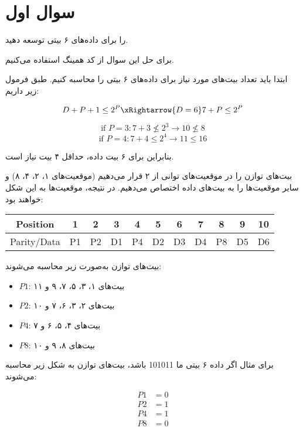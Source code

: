 \section{سوال اول}

را برای داده‌های ۶ بیتی توسعه دهید.

\begin{qsolve}
	برای حل این سوال از کد همینگ استفاده می‌کنیم.
	
	ابتدا باید تعداد بیت‌های  مورد نیاز برای داده‌های ۶ بیتی را محاسبه کنیم. طبق فرمول زیر داریم:
	
	\begin{latin}
		$$ D+P+1 \le 2^P  \xRightarrow{D=6} 7+P\le2^P $$
		
		$$ \text{if } P=3: 7 + 3 \not \leq 2^3 \rightarrow 10 \not \leq 8$$
		$$ \text{if } P=4: 7 + 4 \le  2^4 \rightarrow 11 \leq 16$$
	\end{latin}
	
	
	بنابراین برای ۶ بیت داده، حداقل ۴ بیت  نیاز است.
	
	بیت‌های توازن را در موقعیت‌های توانی از ۲ قرار می‌دهیم (موقعیت‌های ۱، ۲، ۴، ۸) و سایر موقعیت‌ها را به بیت‌های داده اختصاص می‌دهیم. در نتیجه، موقعیت‌ها به این شکل خواهند بود:
	
	\begin{latin}
		\begin{center}
			\begin{tabular}{|c|c|c|c|c|c|c|c|c|c|c|}
				\hline
				Position & 1 & 2 & 3 & 4 & 5 & 6 & 7 & 8 & 9 & 10 \\
				\hline
				Parity/Data & P1 & P2 & D1 & P4 & D2 & D3 & D4 & P8 & D5 & D6 \\
				\hline
			\end{tabular}
		\end{center}
	\end{latin}
	
	
	بیت‌های توازن به‌صورت زیر محاسبه می‌شوند:
	
	\begin{itemize}
		\item \( P1 \): بیت‌های ۱، ۳، ۵، ۷، ۹ و ۱۱
		\item \( P2 \): بیت‌های ۲، ۳، ۶، ۷ و ۱۰
		\item \( P4 \): بیت‌های ۴، ۵، ۶ و ۷
		\item \( P8 \): بیت‌های ۸، ۹ و ۱۰
	\end{itemize}
	
	
	برای مثال اگر داده ۶ بیتی ما 101011 باشد، بیت‌های توازن به شکل زیر محاسبه می‌شوند:
	
	\begin{align*}
		P1 &= 0 \\
		P2 &= 1 \\
		P4 &= 1 \\
		P8 &= 0
	\end{align*}
\end{qsolve}



